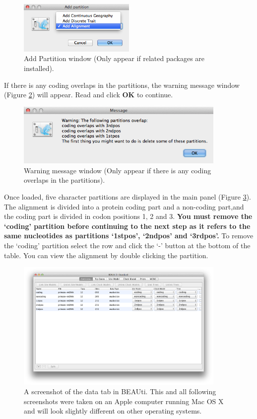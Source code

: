 \documentclass[11pt]{article}
\theoremstyle{plain}%
\theoremstyle{definition}
\theoremstyle{remark}
\begin{document}
\begin{figure}
\centering	
\includegraphics[width=0.5\textwidth]{figures/AddPartition.png}
\caption{Add Partition window (Only appear if related packages are installed).}
\label{fig:addPartition}
\end{figure}

If there is any coding overlaps in the partitions, the warning message window (Figure \ref{fig:warning}) will appear. Read and click \textbf{OK} to continue.

\begin{figure}	
\centering	
\includegraphics[width=0.9\textwidth]{figures/warning.png}
\caption{Warning message window (Only appear if there is any coding overlaps in the partitions).}
\label{fig:warning}
\end{figure}

Once loaded, five character partitions are displayed in the main panel (Figure \ref{fig:BEAUTI_DataPartitions}). The alignment is divided into a protein coding part and a non-coding part,and the coding part is divided in codon positions 1, 2 and 3. 
{\bf You must remove the `coding' partition before continuing to the next step as it refers to the same nucleotides as partitions `1stpos', `2ndpos' and `3rdpos'.} To remove the `coding' partition select the row and click the `-' button at the bottom of the table. 
You can view the alignment by double clicking the partition.

\begin{figure}
\centering	
\includegraphics[width=0.9\textwidth]{figures/BEAUti_DataPartitions}
\caption{A screenshot of the data tab in BEAUti. This and all following screenshots
were taken on an Apple computer running Mac OS X and will look slightly different on other operating systems.}
\label{fig:BEAUTI_DataPartitions}
\end{figure}
\end{document}
